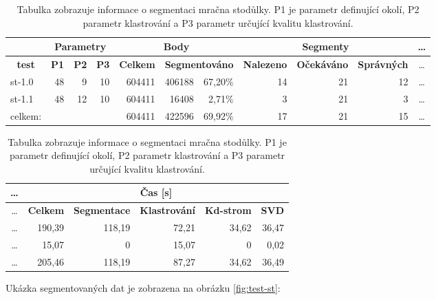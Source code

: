 \documentclass[11pt,twoside,a4paper]{book}
\begin{document}
\begin{table}[ht]
\resizebox{\textwidth}{!} {
\begin{tabular}{|l|c|l|l|r|r|r|r|r|r|c|}
\hline
\textbf{} & \multicolumn{ 3}{c|}{\textbf{Parametry}} & \multicolumn{ 3}{c|}{\textbf{Body}} & \multicolumn{ 3}{c|}{\textbf{Segmenty}} &\ldots\\ \hline
\multicolumn{1}{|c|}{\textbf{test}} & \textbf{P1} & \multicolumn{1}{c|}{\textbf{P2}} & \multicolumn{1}{c|}{\textbf{P3}} & \multicolumn{1}{c|}{\textbf{Celkem}} & \multicolumn{ 2}{c|}{\textbf{Segmentováno}} & \multicolumn{1}{c|}{\textbf{Nalezeno}} & \multicolumn{1}{c|}{\textbf{Očekáváno }} & \multicolumn{1}{c|}{\textbf{Správných}} &\ldots\\ \hline
st-1.0 & \multicolumn{1}{r|}{48} & \multicolumn{1}{r|}{9} & \multicolumn{1}{r|}{10} & 604411 & 406188 & 67,20\% & 14 & 21 & 12 &\ldots\\ \hline
st-1.1 & \multicolumn{1}{r|}{48} & \multicolumn{1}{r|}{12} & \multicolumn{1}{r|}{10} & 604411 & 16408 & 2,71\% & 3 & 21 & 3 &\ldots\\ \hline
celkem: & \multicolumn{1}{l|}{} &  &  & 604411 & 422596 & 69,92\% & 17 & 21 & 15&\ldots \\ \hline
\end{tabular}
}
\begin{flushright} \scalebox{0.9} {
\begin{tabular}{|c|r|r|r|r|r|}
\hline
\ldots& \multicolumn{ 5}{|c|}{\textbf{Čas [s]}} \\ \hline
\ldots& \multicolumn{1}{|c|}{\textbf{Celkem}} & \multicolumn{1}{c|}{\textbf{Segmentace}} & \multicolumn{1}{c|}{\textbf{Klastrování}} & \multicolumn{1}{c|}{\textbf{Kd-strom}} & \multicolumn{1}{c|}{\textbf{SVD}} \\ \hline
\ldots& 190,39 & 118,19 & 72,21 & 34,62 & 36,47 \\ \hline
\ldots& 15,07 & 0 & 15,07 & 0 & 0,02 \\ \hline
\ldots& 205,46 & 118,19 & 87,27 & 34,62 & 36,49 \\ \hline
\end{tabular}
}\end{flushright}

\caption{Tabulka zobrazuje informace o segmentaci mračna stodůlky. P1 je parametr definující okolí, P2 parametr klastrování a P3 parametr určující kvalitu klastrování.} 
\label{table:test-d2}
\end{table}

Ukázka segmentovaných dat je zobrazena na obrázku \ref{fig:test-st}:  
\end{document}

